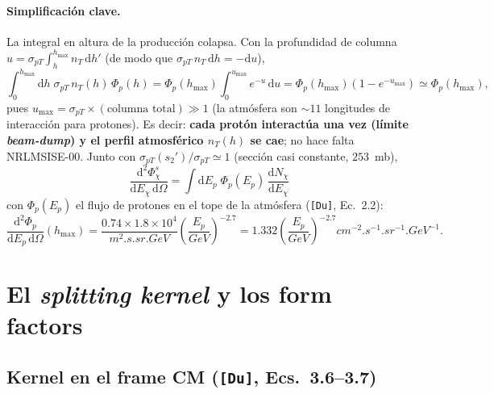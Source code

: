 \documentclass[11pt,a4paper]{article}
\newcommand{\Phip}{\Phi_p}
\newcommand{\dd}{\mathrm{d}}
\newcommand{\Du}{\texttt{[Du]}}
\begin{document}
\paragraph{Simplificaci\'on clave.} La integral en altura de la producci\'on
colapsa. Con la profundidad de columna $u=\sigma_{pT}\int_h^{h_{\max}}n_T\,\dd h'$
(de modo que $\sigma_{pT}\,n_T\,\dd h=-\dd u$),
\begin{equation}
\int_0^{h_{\max}}\!\dd h\;\sigma_{pT}\,n_T(h)\,\Phip(h)
= \Phip(h_{\max})\!\int_0^{u_{\max}}\!e^{-u}\,\dd u
= \Phip(h_{\max})\left(1-e^{-u_{\max}}\right)\simeq \Phip(h_{\max}),
\end{equation}
pues $u_{\max}=\sigma_{pT}\times(\text{columna total})\gg1$ (la atm\'osfera
son $\sim\!11$ longitudes de interacci\'on para protones). Es decir:
\textbf{cada prot\'on interact\'ua una vez (l\'imite \emph{beam-dump}) y el
perfil atmosf\'erico $n_T(h)$ se cae}; no hace falta NRLMSISE-00. Junto con
$\sigma_{pT}(s_2')/\sigma_{pT}\simeq1$ (secci\'on casi constante, $253$~mb),
\begin{equation}
\boxed{\;
\frac{\dd^2\Phi_\chi^s}{\dd E_\chi\,\dd\Omega}
= \int \dd E_p\;\Phip(E_p)\,\frac{\dd N_\chi}{\dd E_\chi}
\;}
\label{eq:flux_collapsed}
\end{equation}
con $\Phip(E_p)$ el flujo de protones en el tope de la atm\'osfera (\Du,
Ec.~2.2):
\begin{equation}
\frac{\dd^2\Phip}{\dd E_p\,\dd\Omega}(h_{\max})
= \frac{0.74\times1.8\times10^4}{\si{m^2.s.sr.GeV}}
\left(\frac{E_p}{\si{GeV}}\right)^{-2.7}
= 1.332\left(\frac{E_p}{\si{GeV}}\right)^{-2.7}\si{cm^{-2}.s^{-1}.sr^{-1}.GeV^{-1}} .
\end{equation}

\section{El \emph{splitting kernel} y los form factors}

\subsection{Kernel en el frame CM (\Du, Ecs.~3.6--3.7)}
\end{document}
